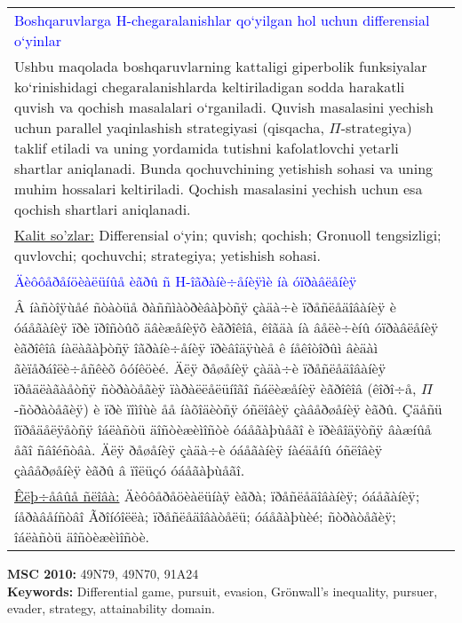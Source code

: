 \documentclass[10 pt]{book}
\begin{document}
%
%
{\small
\begin{center}
\begin{tabular}{p{9cm}}
\textcolor{blue}{Boshqaruvlarga H-chegaralanishlar qo`yilgan hol uchun differensial o`yinlar}\\
Ushbu maqolada boshqaruvlarning kattaligi  giperbolik funksiyalar ko`rinishidagi  chegaralanishlarda keltiriladigan sodda harakatli
 quvish va qochish masalalari  o`rganiladi. Quvish masalasini yechish uchun  parallel yaqinlashish strategiyasi
  (qisqacha, $\Pi$-strategiya) taklif etiladi va uning yordamida  tutishni kafolatlovchi yetarli shartlar aniqlanadi. Bunda qochuvchining yetishish
   sohasi va uning muhim hossalari keltiriladi.  Qochish masalasini yechish uchun esa qochish    shartlari  aniqlanadi.\\
\noindent \underline{Kalit so'zlar:} Differensial o`yin; quvish; qochish; Gronuoll tengsizligi; quvlovchi; qochuvchi; strategiya; yetishish sohasi.\\
[0.5 cm]
\textcolor{blue}{Äèôôåðåíöèàëüíûå èãðû ñ H-îãðàíè÷åíèÿìè íà óïðàâëåíèÿ}\\
Â íàñòîÿùåé ñòàòüå ðàññìàòðèâàþòñÿ çàäà÷è ïðåñëåäîâàíèÿ è óáåãàíèÿ ïðè ïðîñòûõ äâèæåíèÿõ èãðîêîâ, êîãäà íà  âåëè÷èíû óïðàâëåíèÿ èãðîêîâ íàëàãàþòñÿ
îãðàíè÷åíèÿ   ïðèâîäÿùèå  ê  íåêîòîðûì âèäàì ãèïåðáîëè÷åñêèõ  ôóíêöèé. Äëÿ ðåøåíèÿ çàäà÷è ïðåñëåäîâàíèÿ ïðåäëàãàåòñÿ ñòðàòåãèÿ ïàðàëëåëüíîãî
 ñáëèæåíèÿ èãðîêîâ (êîðî÷å, $\Pi$-ñòðàòåãèÿ) è ïðè ïîìîùè åå íàõîäèòñÿ óñëîâèÿ çàâåðøåíèÿ èãðû. Çäåñü  îïðåäåëÿåòñÿ  îáëàñòü  äîñòèæèìîñòè óáåãàþùåãî è ïðèâîäÿòñÿ
  âàæíûå åãî ñâîéñòâà. Äëÿ ðåøåíèÿ çàäà÷è óáåãàíèÿ íàéäåíû  óñëîâèÿ çàâåðøåíèÿ èãðû  â ïîëüçó óáåãàþùåãî.\\

\noindent \underline{Êëþ÷åâûå ñëîâà:} Äèôôåðåöèàëüíàÿ èãðà; ïðåñëåäîâàíèÿ; óáåãàíèÿ; íåðàâåíñòâî Ãðîíóîëëà; ïðåñëåäîâàòåëü; óáåãàþùèé;
 ñòðàòåãèÿ; îáëàñòü äîñòèæèìîñòè.
\end{tabular}\end{center} }
\vspace{0.5 cm}

\noindent \textbf{MSC 2010: } 49N79, 49N70, 91A24
\\
\noindent \textbf{Keywords:} Differential game, pursuit, evasion, Gr\"{o}nwall's inequality, pursuer, evader, strategy, attainability domain.
\end{document}
